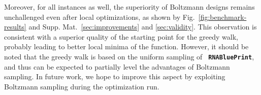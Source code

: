 \documentclass[twocolumn]{bmcart}%
\newcommand{\Obj}{\text{\rm MultiDefect}}
\newcommand{\RNAblueprint}{{\tt \bfseries{}\color{black!85} RNA\textcolor{blue!70!black}{Blue}Print}}
\newcommand{\ourprog}{{\tt \bfseries{}\color{black!85}RNA\textcolor{red!70!black}{Red}Print}}
\begin{document}
%
Moreover, for all instances as well, the superiority of Boltzmann designs
remains unchallenged even after local optimizations, as shown by
Fig.~\ref{fig:benchmark-results} and Supp. Mat.~\ref{sec:improvements}
and \ref{sec:validity}. This observation is consistent with a
superior quality of the starting point for the greedy walk, probably leading
to better local minima of the \Obj{} function. However, it should be noted
that the greedy walk is based on the uniform sampling of
\RNAblueprint{}, and thus can be expected to partially level the
advantages of Boltzmann sampling. In future work, we hope to improve
this aspect by exploiting Boltzmann sampling during the
optimization run.

%
%
\end{document}
